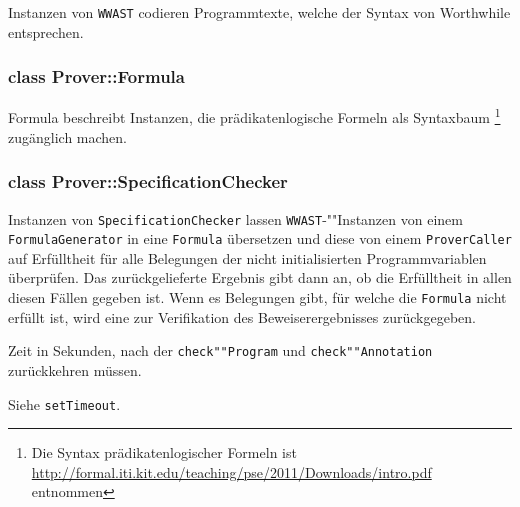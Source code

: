 Instanzen von \texttt{WWAST} codieren Programmtexte, welche der Syntax
von Worthwhile entsprechen.%

\subsubsection{class Prover::Formula}%

Formula beschreibt Instanzen, die prädikatenlogische Formeln als
Syntaxbaum \footnote{Die Syntax prädikatenlogischer Formeln ist
\url{http://formal.iti.kit.edu/teaching/pse/2011/Downloads/intro.pdf}
entnommen} zugänglich machen.%

\subsubsection{class Prover::SpecificationChecker}%


Instanzen von \texttt{SpecificationChecker} lassen
\texttt{WWAST}-""Instanzen von einem \texttt{FormulaGenerator} in eine
\texttt{Formula} übersetzen und diese von einem \texttt{ProverCaller}
auf Erfülltheit für alle Belegungen der nicht initialisierten
Programmvariablen überprüfen. Das zurückgelieferte Ergebnis gibt dann
an, ob die Erfülltheit in allen diesen Fällen gegeben ist. Wenn es
Belegungen gibt, für welche die \texttt{Formula} nicht erfüllt ist,
wird eine zur Verifikation des Beweiserergebnisses zurückgegeben.%


\begin{description}%

    Zeit in Sekunden, nach der \texttt{check""Program} und
    \texttt{check""Annotation} zurückkehren müssen.%

    Siehe \texttt{setTimeout}.%


\end{description}%


